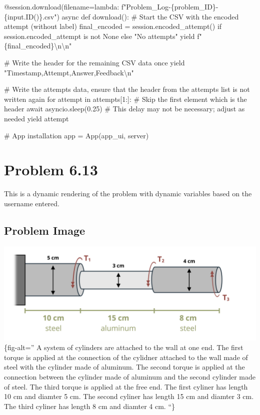 \documentclass[
  letterpaper,
  DIV=11,
  numbers=noendperiod]{scrreprt}
\newenvironment{Shaded}{\begin{snugshade}}{\end{snugshade}}
\newcommand{\NormalTok}[1]{\textcolor[rgb]{0.00,0.23,0.31}{#1}}
\begin{document}
\begin{Shaded}
\begin{Highlighting}[]
\NormalTok{    @session.download(filename=lambda: f"Problem\_Log{-}\{problem\_ID\}{-}\{input.ID()\}.csv")}
\NormalTok{    async def download():}
\NormalTok{        \# Start the CSV with the encoded attempt (without label)}
\NormalTok{        final\_encoded = session.encoded\_attempt() if session.encoded\_attempt is not None else "No attempts"}
\NormalTok{        yield f"\{final\_encoded\}\textbackslash{}n\textbackslash{}n"}
        
\NormalTok{        \# Write the header for the remaining CSV data once}
\NormalTok{        yield "Timestamp,Attempt,Answer,Feedback\textbackslash{}n"}
        
\NormalTok{        \# Write the attempts data, ensure that the header from the attempts list is not written again}
\NormalTok{        for attempt in attempts[1:]:  \# Skip the first element which is the header}
\NormalTok{            await asyncio.sleep(0.25)  \# This delay may not be necessary; adjust as needed}
\NormalTok{            yield attempt}


\NormalTok{\# App installation}
\NormalTok{app = App(app\_ui, server)}
\end{Highlighting}
\end{Shaded}

\chapter*{Problem 6.13}\label{problem-6.13}


This is a dynamic rendering of the problem with dynamic variables based
on the username entered.

\section*{Problem Image}\label{problem-image-66}


\includegraphics{images/269.png}\{fig-alt='' A system of cylinders are
attached to the wall at one end. The first torque is applied at the
connection of the cylidner attached to the wall made of steel with the
cylinder made of aluminum. The second torque is applied at the
connection between the cylinder made of aluminum and the second cylinder
made of steel. The third torque is applied at the free end. The first
cyliner has length 10 cm and diamter 5 cm. The second cyliner has length
15 cm and diamter 3 cm. The third cyliner has length 8 cm and diamter 4
cm. ``\}
\end{document}
